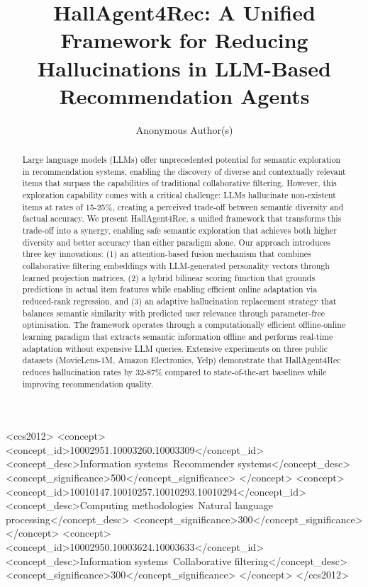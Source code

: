 \documentclass[acmsmall]{acmart}
\title{HallAgent4Rec: A Unified Framework for Reducing Hallucinations in LLM-Based Recommendation Agents}
\author{Anonymous Author(s)}
\begin{document}
\begin{abstract}
Large language models (LLMs) offer unprecedented potential for semantic exploration in recommendation systems, enabling the discovery of diverse and contextually relevant items that surpass the capabilities of traditional collaborative filtering. However, this exploration capability comes with a critical challenge: LLMs hallucinate non-existent items at rates of 15-25\%, creating a perceived trade-off between semantic diversity and factual accuracy. We present HallAgent4Rec, a unified framework that transforms this trade-off into a synergy, enabling safe semantic exploration that achieves both higher diversity and better accuracy than either paradigm alone.%
Our approach introduces three key innovations: (1) an attention-based fusion mechanism that combines collaborative filtering embeddings with LLM-generated personality vectors through learned projection matrices, (2) a hybrid bilinear scoring function that grounds predictions in actual item features while enabling efficient online adaptation via reduced-rank regression, and (3) an adaptive hallucination replacement strategy that balances semantic similarity with predicted user relevance through parameter-free optimisation. The framework operates through a computationally efficient offline-online learning paradigm that extracts semantic information offline and performs real-time adaptation without expensive LLM queries. Extensive experiments on three public datasets (MovieLens-1M, Amazon Electronics, Yelp) demonstrate that HallAgent4Rec reduces hallucination rates by 32-87\% compared to state-of-the-art baselines while improving recommendation quality. %
\end{abstract}
\maketitle
\begin{CCSXML}
<ccs2012>
<concept>
<concept_id>10002951.10003260.10003309</concept_id>
<concept_desc>Information systems~Recommender systems</concept_desc>
<concept_significance>500</concept_significance>
</concept>
<concept>
<concept_id>10010147.10010257.10010293.10010294</concept_id>
<concept_desc>Computing methodologies~Natural language processing</concept_desc>
<concept_significance>300</concept_significance>
</concept>
<concept>
<concept_id>10002950.10003624.10003633</concept_id>
<concept_desc>Information systems~Collaborative filtering</concept_desc>
<concept_significance>300</concept_significance>
</concept>
</ccs2012>
\end{CCSXML}
\end{document}
